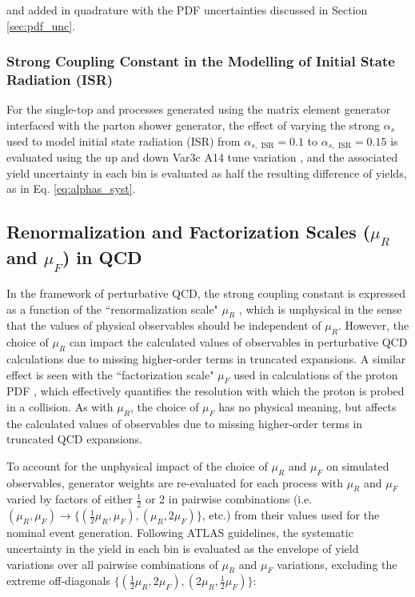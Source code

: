 \noindent and added in quadrature with the PDF uncertainties discussed in Section \ref{sec:pdf_unc}.

\subsubsection{Strong Coupling Constant in the Modelling of Initial State Radiation (ISR)}

For the single-top and \ttbar processes generated using the \POWHEGBOX matrix element generator interfaced with the  parton shower generator, the effect of varying the strong \(\alpha_s\) used to model initial state radiation (ISR) from \(\alpha_{s,\text{ ISR}}=0.1\) to \(\alpha_{s, \text{ ISR}}=0.15\) is evaluated using the up and down Var3c A14 tune variation \cite{ATL-PHYS-PUB-2014-021}, and the associated yield uncertainty in each bin is evaluated as half the resulting difference of yields, as in Eq. \ref{eq:alphas_syst}. 

\subsection{Renormalization and Factorization Scales (\(\mu_R\) and \(\mu_F\)) in QCD}

In the framework of perturbative QCD, the strong coupling constant is expressed as a function of the ``renormalization scale" \(\mu_R\) \cite{PDG_2018}, which is unphysical in the sense that the values of physical observables should be independent of \(\mu_R\). However, the choice of \(\mu_R\) can impact the calculated values of observables in perturbative QCD calculations due to missing higher-order terms in truncated expansions. A similar effect is seen with the ``factorization scale" \(\mu_F\) used in calculations of the proton PDF \cite{maltoni2007choosing}, which effectively quantifies the resolution with which the proton is probed in a collision. As with \(\mu_R\), the choice of \(\mu_F\) has no physical meaning, but affects the calculated values of observables due to missing higher-order terms in truncated QCD expansions.

To account for the unphysical impact of the choice of \(\mu_R\) and \(\mu_F\) on simulated observables, generator weights are re-evaluated for each process with \(\mu_R\) and \(\mu_F\) varied by factors of either \(\frac{1}{2}\) or 2 in pairwise combinations (i.e. \((\mu_R, \mu_F)\rightarrow \{(\frac{1}{2}\mu_R, \mu_F), (\mu_R, 2\mu_F)\}\), etc.) from their values used for the nominal event generation. Following ATLAS guidelines, the systematic uncertainty in the yield in each bin is evaluated as the envelope of yield variations over all pairwise combinations of \(\mu_R\) and \(\mu_F\) variations, excluding the extreme off-diagonals \(\{(\frac{1}{2}\mu_R, 2\mu_F), (2\mu_R, \frac{1}{2}\mu_F)\}\): 

